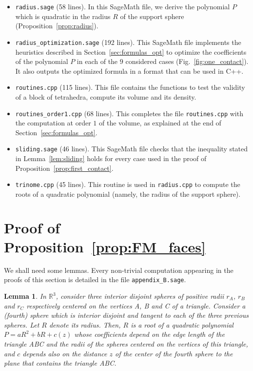 \documentclass[11pt]{article}
\newtheorem{lemma}{Lemma}
\begin{document}
\begin{itemize}
\item \verb+radius.sage+ (58 lines).
In this SageMath file, we derive the polynomial $P$ which is quadratic in the radius $R$ of the support sphere (Proposition~\ref{prop:radius}).

\item \verb+radius_optimization.sage+ (192 lines).
This SageMath file implements the heuristics described in Section~\ref{sec:formulas_opt} to optimize the coefficients of the polynomial $P$ in each of the $9$ considered cases (Fig.~\ref{fig:one_contact}).
It also outputs the optimized formula in a format that can be used in C++.

\item \verb+routines.cpp+ (115 lines).
This file contains the functions to test the validity of a block of tetrahedra, compute its volume and its density.

\item \verb+routines_order1.cpp+ (68 lines).
This completes the file \verb+routines.cpp+ with the computation at order $1$ of the volume, as explained at the end of Section~\ref{sec:formulas_opt}.

\item \verb+sliding.sage+ (46 lines).
This SageMath file checks that the inequality stated in Lemma~\ref{lem:sliding} holds for every case used in the proof of Proposition~\ref{prop:first_contact}.

\item \verb+trinome.cpp+ (45 lines).
This routine is used in \verb+radius.cpp+ to compute the roots of a quadratic polynomial (namely, the radius of the support sphere).

\end{itemize}

\section{Proof of Proposition~\ref{prop:FM_faces}}
\label{sec:proof_FM_faces}

We shall need some lemmas.
Every non-trivial computation appearing in the proofs of this section is detailed in the file \verb+appendix_B.sage+.

\begin{lemma}
\label{lem:quadradic_poly}
In $\mathbb{R}^3$, consider three interior disjoint spheres of positive radii $r_A$, $r_B$ and $r_C$ respectively centered on the vertices A, B and C of a triangle.
Consider a (fourth) sphere which is interior disjoint and tangent to each of the three previous spheres.
Let $R$ denote its radius.
Then, $R$ is a root of a quadratic polynomial $P=aR^2+bR+c(z)$ whose coefficients depend on the edge length of the triangle ABC and the radii of the spheres centered on the vertices of this triangle, and $c$ depends also on the distance $z$ of the center of the fourth sphere to the plane that contains the triangle ABC.
\end{lemma}
\end{document}
